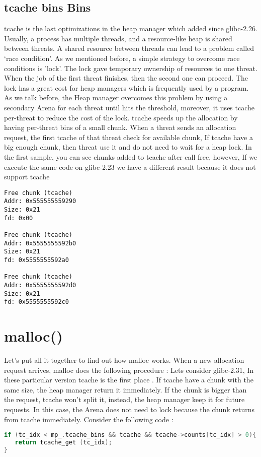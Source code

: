 \documentclass{masterthesis}
\newcommand*\libc{glibc}
\newcommand*\tch{tcache}
\begin{document}
\subsection{\tch{} bins Bins}
\tch{} is the last optimizations in the heap manager which added since \libc{-2.26}. Usually, a process has multiple threads, and a resource-like heap is shared between threats. A shared resource between threads can lead to a problem called ‘race condition’. As we mentioned before, a simple strategy to overcome race conditions is 'lock'. The lock gave temporary ownership of resources to one threat. When the job of the first threat finishes, then the second one can proceed. The lock has a great cost for heap managers which is frequently used by a program. As we talk before, the Heap manager overcomes this problem by using a secondary Arena for each threat until hits the threshold, moreover, it uses \tch{} per-threat to reduce the cost of the lock. \tch{} speeds up the allocation by having per-threat bins of a small chunk. When a threat sends an allocation request, the first \tch{} of that threat check for available chunk, If \tch{} have a big enough chunk, then threat use it and do not need to wait for a heap lock. In the first sample, you can see chunks added to \tch{} after call free, however, If we execute the same code on \libc{-2.23} we have a different result because it does not support \tch{}

\begin{lstlisting}[frame=tlrb]
Free chunk (tcache) 
Addr: 0x555555559290
Size: 0x21
fd: 0x00

Free chunk (tcache) 
Addr: 0x5555555592b0
Size: 0x21
fd: 0x5555555592a0

Free chunk (tcache) 
Addr: 0x5555555592d0
Size: 0x21
fd: 0x5555555592c0
\end{lstlisting}

\section{malloc()}
Let's put all it together to find out how malloc works. When a new allocation request arrives, malloc does the following procedure :
Lets consider \libc{-2.31}, In these particular version \tch{} is the first place . If \tch{} have a chunk with the same size, the heap manager return it immediately. If the chunk is bigger than the request, \tch{} won't split it, instead, the heap manager keep it for future requests. In this case, the Arena does not need to lock because the chunk returns from \tch{} immediately. Consider the following code :
\begin{lstlisting}[language=c,frame=tlrb]
 if (tc_idx < mp_.tcache_bins && tcache && tcache->counts[tc_idx] > 0){
   return tcache_get (tc_idx);
}
\end{lstlisting}
\end{document}
